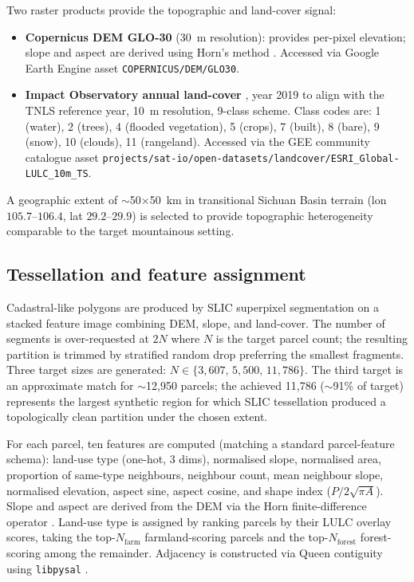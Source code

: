 \documentclass[]{interact}
\theoremstyle{plain}
\begin{document}
Two raster products provide the topographic and land-cover signal:
\begin{itemize}
\item \textbf{Copernicus DEM GLO-30} \citep{esa2021copernicusdem} (30~m resolution): provides per-pixel elevation; slope and aspect are derived using Horn's method \citep{horn1981slope}. Accessed via Google Earth Engine asset \texttt{COPERNICUS/DEM/GLO30}.
\item \textbf{Impact Observatory annual land-cover} \citep{karra2021global}, year 2019 to align with the TNLS reference year, 10~m resolution, 9-class scheme. Class codes are: 1 (water), 2 (trees), 4 (flooded vegetation), 5 (crops), 7 (built), 8 (bare), 9 (snow), 10 (clouds), 11 (rangeland). Accessed via the GEE community catalogue asset \texttt{projects/sat-io/open-datasets/landcover/ESRI\_Global-LULC\_10m\_TS}.
\end{itemize}

A geographic extent of $\sim$50$\times$50~km in transitional Sichuan Basin terrain (lon $105.7$--$106.4$, lat $29.2$--$29.9$) is selected to provide topographic heterogeneity comparable to the target mountainous setting.

\subsection{Tessellation and feature assignment}

Cadastral-like polygons are produced by SLIC superpixel segmentation \citep{achanta2012slic} on a stacked feature image combining DEM, slope, and land-cover. The number of segments is over-requested at $2N$ where $N$ is the target parcel count; the resulting partition is trimmed by stratified random drop preferring the smallest fragments. Three target sizes are generated: $N \in \{3{,}607,\, 5{,}500,\, 11{,}786\}$. The third target is an approximate match for $\sim$12{,}950 parcels; the achieved 11{,}786 ($\sim$91\% of target) represents the largest synthetic region for which SLIC tessellation produced a topologically clean partition under the chosen extent.

For each parcel, ten features are computed (matching a standard parcel-feature schema): land-use type (one-hot, 3 dims), normalised slope, normalised area, proportion of same-type neighbours, neighbour count, mean neighbour slope, normalised elevation, aspect sine, aspect cosine, and shape index ($P / 2\sqrt{\pi A}$). Slope and aspect are derived from the DEM via the Horn finite-difference operator \citep{horn1981slope}. Land-use type is assigned by ranking parcels by their LULC overlay scores, taking the top-$N_{\text{farm}}$ farmland-scoring parcels and the top-$N_{\text{forest}}$ forest-scoring among the remainder. Adjacency is constructed via Queen contiguity using \texttt{libpysal} \citep{rey2007pysal}.
\end{document}
